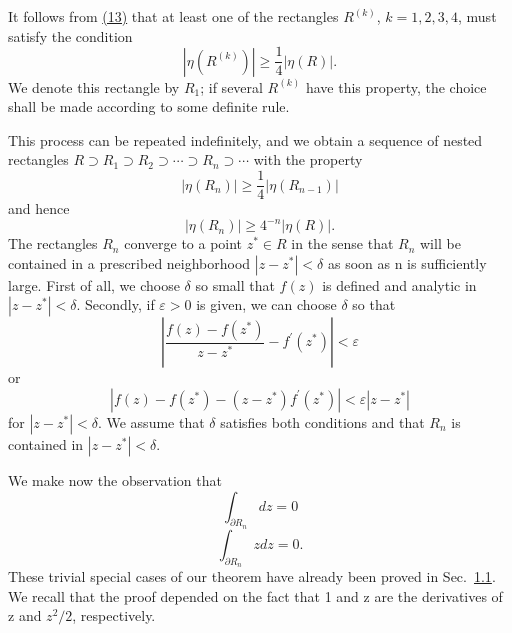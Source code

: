 \begingroup\renewcommand{\thefootnote}{}\endgroup

It follows from \hyperref[eq:4.13]{(13)} that at least one of the rectangles $R^{(k)}$, $k = 1, 2, 3, 4$, must satisfy the condition
\begin{equation*}
\left| \eta (R ^ {(k)}) \right| \geq \frac {1}{4} | \eta (R) |.
\end{equation*}
We denote this rectangle by $R_1$; if several $R^{(k)}$ have this property, the choice shall be made according to some definite rule.

This process can be repeated indefinitely, and we obtain a sequence of nested rectangles $R \supset R_{1} \supset R_{2} \supset \cdots \supset R_{n} \supset \cdots$ with the property
\begin{equation*}
\left| \eta (R _ {n}) \right| \geq \frac {1}{4} \left| \eta (R _ {n - 1}) \right|
\end{equation*}
and hence
\begin{equation*}
| \eta (R _ {n}) | \geq 4 ^ {- n} | \eta (R) |.\tag{14}\label{eq:4.14}
\end{equation*}
The rectangles $R_{n}$ converge to a point $z^{*} \in R$ in the sense that $R_{n}$ will be contained in a prescribed neighborhood $|z - z^{*}| < \delta$ as soon as n is sufficiently large. First of all, we choose $\delta$ so small that $f(z)$ is defined and analytic in $|z - z^{*}| < \delta$. Secondly, if $\varepsilon > 0$ is given, we can choose $\delta$ so that
\begin{equation*}
\left| \frac {f (z) - f (z ^ {*})}{z - z ^ {*}} - f ^ {\prime} (z ^ {*}) \right| <   \varepsilon
\end{equation*}
or
\begin{equation*}
\left| f (z) - f \left(z ^ {*}\right) - \left(z - z ^ {*}\right) f ^ {\prime} \left(z ^ {*}\right) \right| <   \varepsilon \left| z - z ^ {*} \right|\tag{15}\label{eq:4.15}
\end{equation*}
for $|z - z^{*}| < \delta$. We assume that $\delta$ satisfies both conditions and that $R_{n}$ is contained in $|z - z^{*}| < \delta$.

We make now the observation that
\begin{equation*}
\int_ {\partial R _ {n}} d z = 0
\end{equation*}
\begin{equation*}
\int_ {\partial R _ {n}} z d z = 0.
\end{equation*}
These trivial special cases of our theorem have already been proved in Sec.~\hyperref[sec:4.1.1]{1.1}. We recall that the proof depended on the fact that 1 and z are the derivatives of z and $z^{2}/2$, respectively.

